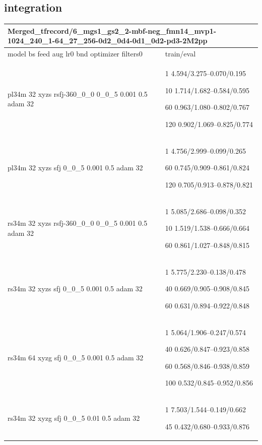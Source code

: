 \documentclass[,table,dvipsnames]{article}
\begin{document}
\subsection{integration}
\noindent\begin{tabular}{|p{9cm}|p{6cm}| }	
	\hline
	\multicolumn{2}{|p{15cm}|}{Merged\_tfrecord/6\_mgs1\_gs2\_2-mbf-neg\_fmn14\_mvp1-1024\_240\_1-64\_27\_256-0d2\_0d4-0d1\_0d2-pd3-2M2pp}\\
	\hline
	model bs feed aug lr0 bnd optimizer filters0 & train/eval \\
	
	\rowcolor{green!20}
	pl34m 32 xyzs rsfj-360\_0\_0 0\_0\_5 0.001 0.5 adam 32& 1 4.594/3.275--0.070/0.195\par 10 1.714/1.682--0.584/0.595\par 60 0.963/1.080--0.802/0.767\par 120 0.902/1.069--0.825/0.774\\
	
	\rowcolor{red!20}
	pl34m 32 xyzs sfj 0\_0\_5 0.001 0.5 adam 32& 1 4.756/2.999--0.099/0.265\par 60 0.745/0.909--0.861/0.824\par 120 0.705/0.913--0.878/0.821\\
	
	\rowcolor{blue!20}
	rs34m 32 xyzs rsfj-360\_0\_0 0\_0\_5 0.001 0.5 adam 32&  1 5.085/2.686--0.098/0.352\par 10 1.519/1.538--0.666/0.664\par 60 0.861/1.027--0.848/0.815\\
	
	\rowcolor{yellow!20}
	rs34m 32 xyzs sfj 0\_0\_5 0.001 0.5 adam 32& 1 5.775/2.230--0.138/0.478\par 40 0.669/0.905--0.908/0.845\par 60 0.631/0.894--0.922/0.848\\
	\hline\hline
	
	
	\rowcolor{orange!20}
	rs34m 64 xyzg sfj 0\_0\_5 0.001 0.5 adam 32& 1 5.064/1.906--0.247/0.574\par 40 0.626/0.847--0.923/0.858\par 60 0.568/0.846--0.938/0.859\par 100 0.532/0.845--0.952/0.856\\
	
	\rowcolor{blue!20}
	rs34m 32 xyzg sfj 0\_0\_5 0.01 0.5 adam 32& 1 7.503/1.544--0.149/0.662\par 45 0.432/0.680--0.933/0.876\\
	

\end{tabular}
\end{document}

